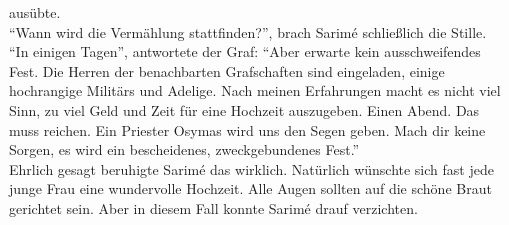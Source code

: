 ausübte.\\
``Wann wird die Vermählung stattfinden?'', brach Sarimé schließlich die Stille. \\
``In einigen Tagen'', antwortete der Graf: ``Aber erwarte kein ausschweifendes Fest. Die Herren der 
benachbarten Grafschaften sind eingeladen, einige hochrangige Militärs und Adelige. Nach meinen 
Erfahrungen macht es nicht viel Sinn,  zu viel Geld und Zeit für eine Hochzeit auszugeben. Einen 
Abend. Das muss reichen. Ein Priester Osymas wird uns den Segen geben. Mach dir keine Sorgen, es 
wird ein bescheidenes, zweckgebundenes Fest.''\\
Ehrlich gesagt beruhigte Sarimé das wirklich. Natürlich wünschte sich fast jede junge Frau eine 
wundervolle Hochzeit. Alle Augen sollten auf die schöne Braut gerichtet sein. Aber in diesem Fall 
konnte Sarimé drauf verzichten. \\